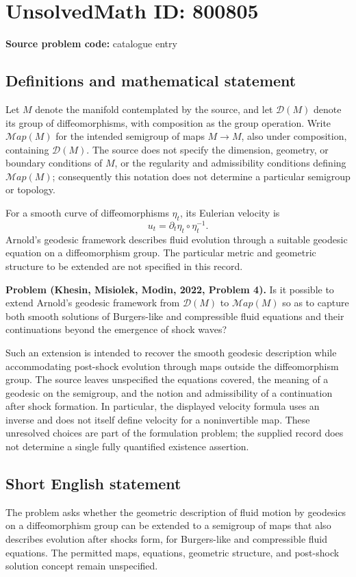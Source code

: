 \documentclass[11pt]{article}
\begin{document}
\section*{UnsolvedMath ID: 800805}
\textbf{Source problem code:} catalogue entry
\subsection{Definitions and mathematical statement}
Let \(M\) denote the manifold contemplated by the source, and let \(\mathscr{D}(M)\) denote its group of diffeomorphisms, with composition as the group operation. Write \(\mathcal{M}ap(M)\) for the intended semigroup of maps \(M\to M\), also under composition, containing \(\mathscr{D}(M)\). The source does not specify the dimension, geometry, or boundary conditions of \(M\), or the regularity and admissibility conditions defining \(\mathcal{M}ap(M)\); consequently this notation does not determine a particular semigroup or topology.

For a smooth curve of diffeomorphisms \(\eta_t\), its Eulerian velocity is
\[
 u_t=\partial_t\eta_t\circ\eta_t^{-1}.
\]
Arnold's geodesic framework describes fluid evolution through a suitable geodesic equation on a diffeomorphism group. The particular metric and geometric structure to be extended are not specified in this record.

\textbf{Problem (Khesin, Misiolek, Modin, 2022, Problem 4).} Is it possible to extend Arnold's geodesic framework from \(\mathscr{D}(M)\) to \(\mathcal{M}ap(M)\) so as to capture both smooth solutions of Burgers-like and compressible fluid equations and their continuations beyond the emergence of shock waves?

Such an extension is intended to recover the smooth geodesic description while accommodating post-shock evolution through maps outside the diffeomorphism group. The source leaves unspecified the equations covered, the meaning of a geodesic on the semigroup, and the notion and admissibility of a continuation after shock formation. In particular, the displayed velocity formula uses an inverse and does not itself define velocity for a noninvertible map. These unresolved choices are part of the formulation problem; the supplied record does not determine a single fully quantified existence assertion.
\subsection{Short English statement}
The problem asks whether the geometric description of fluid motion by geodesics on a diffeomorphism group can be extended to a semigroup of maps that also describes evolution after shocks form, for Burgers-like and compressible fluid equations. The permitted maps, equations, geometric structure, and post-shock solution concept remain unspecified.
\end{document}
